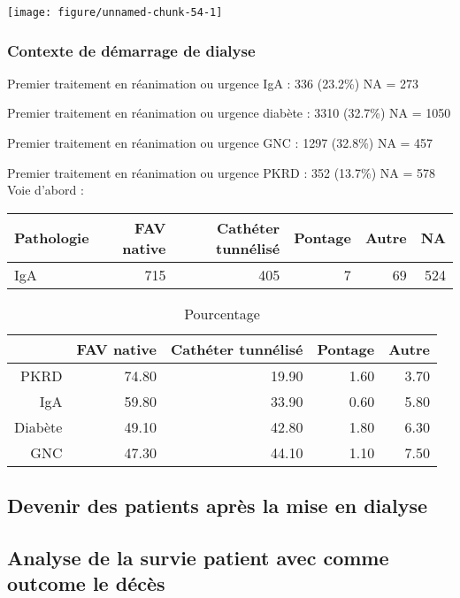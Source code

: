 \documentclass[11pt,a4paper]{article}\usepackage[]{graphicx}\usepackage[]{color}
\makeatletter
\def\maxwidth{ %
  \ifdim\Gin@nat@width>\linewidth
    \linewidth
  \else
    \Gin@nat@width
  \fi
}
\makeatother
\begin{document}
\texttt{[image: figure/unnamed-chunk-54-1]} 


    \subsubsection{Contexte de démarrage de dialyse}



    
Premier traitement en réanimation ou urgence IgA :  336 (23.2\%) NA = 273

Premier traitement en réanimation ou urgence diabète :  3310 (32.7\%) NA = 1050

Premier traitement en réanimation ou urgence GNC :  1297 (32.8\%) NA = 457

Premier traitement en réanimation ou urgence PKRD :  352 (13.7\%) NA = 578
~\\

Voie d’abord :
\begin{table}[ht]
\centering
\begin{tabular}{lrrrrr}
  \hline
Pathologie & FAV native & Cathéter tunnélisé & Pontage & Autre & NA \\ 
  \hline
IgA & 715 & 405 &   7 &  69 & 524 \\ 
   \hline
\end{tabular}
\end{table}
\begin{table}[ht]
\centering
\begin{tabular}{rrrrr}
  \hline
 & FAV native & Cathéter tunnélisé & Pontage & Autre \\ 
  \hline
PKRD & 74.80 & 19.90 & 1.60 & 3.70 \\ 
  IgA & 59.80 & 33.90 & 0.60 & 5.80 \\ 
  Diabète & 49.10 & 42.80 & 1.80 & 6.30 \\ 
  GNC & 47.30 & 44.10 & 1.10 & 7.50 \\ 
   \hline
\end{tabular}
\caption{Pourcentage} 
\end{table}


  \subsection{Devenir des patients après la mise en dialyse}
  
  \subsection{Analyse de la survie patient avec comme outcome le décès}
  
\end{document}
